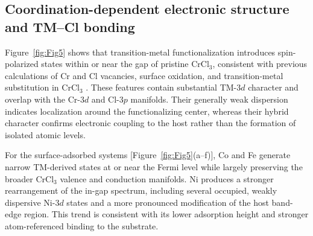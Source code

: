 \documentclass[journal=jacsat,manuscript=article]{achemso}
\begin{document}
\subsection{Coordination-dependent electronic structure and TM--Cl bonding}

\noindent Figure~\ref{fig:Fig5} shows that transition-metal functionalization introduces spin-polarized states within or near the gap of pristine CrCl$_3$, consistent with previous calculations of Cr and Cl vacancies, surface oxidation, and transition-metal substitution in CrCl$_3$ \cite{Gao2018,Mastrippolito2021,Wang2019,Safi2023}. These features contain substantial TM-$3d$ character and overlap with the Cr-$3d$ and Cl-$3p$ manifolds. Their generally weak dispersion indicates localization around the functionalizing center, whereas their hybrid character confirms electronic coupling to the host rather than the formation of isolated atomic levels.

For the surface-adsorbed systems [Figure~\ref{fig:Fig5}(a--f)], Co and Fe generate narrow TM-derived states at or near the Fermi level while largely preserving the broader CrCl$_3$ valence and conduction manifolds. Ni produces a stronger rearrangement of the in-gap spectrum, including several occupied, weakly dispersive Ni-$3d$ states and a more pronounced modification of the host band-edge region. This trend is consistent with its lower adsorption height and stronger atom-referenced binding to the substrate.
\end{document}
